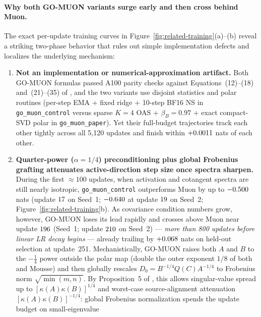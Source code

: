 \paragraph{Why both GO-MUON variants surge early and then cross behind Muon.}
The exact per-update training curves in Figure~\ref{fig:related-training}(a)--(b)
reveal a striking two-phase behavior that rules out simple implementation
defects and localizes the underlying mechanism:
\begin{enumerate}
\item \textbf{Not an implementation or numerical-approximation artifact.}
  Both GO-MUON formulas passed A100 parity checks against Equations~(12)--(18)
  and~(21)--(35) of \citet{che2026gomuon}, and the two variants use disjoint
  statistics and polar routines (per-step EMA + fixed ridge + 10-step BF16 NS
  in \texttt{go\_muon\_control} versus sparse $K=4$ OAS + $\beta_B=0.97$ +
  exact compact-SVD polar in \texttt{go\_muon\_paper}). Yet their full-budget
  trajectories track each other tightly across all 5{,}120 updates and finish
  within $+0.0011{}$ nats of each other.
\item \textbf{Quarter-power ($\alpha = 1/4$) preconditioning plus global
  Frobenius grafting attenuates active-direction step size once spectra
  sharpen.}
  During the first $\approx 100$ updates, when activation and cotangent spectra
  are still nearly isotropic, \texttt{go\_muon\_control} outperforms Muon by up
  to $-0.500{}$ nats (update $17{}$ on
  Seed~1; $-0.640{}$ at update $19{}$ on
  Seed~2; Figure~\ref{fig:related-training}b). As covariance condition numbers
  grow, however, GO-MUON loses its lead rapidly and crosses above Muon near
  update $196{}$ (Seed~1; update
  $210{}$ on Seed~2) --- \emph{more than 800 updates before
  linear LR decay begins} --- already trailing by
  $+0.068{}$ nats on held-out selection at update~251.
  Mechanistically, GO-MUON raises both $A$ and $B$ to the $-\frac{1}{4}$ power
  outside the polar map (double the outer exponent $1/8$ of both 
  and Mousse) and then globally rescales $D_0 = B^{-1/4}Q(C)A^{-1/4}$ to
  Frobenius norm $\sqrt{\min(m,n)}$. By Proposition~5 of \citet{che2026gomuon},
  this allows singular-value spread up to $[\kappa(A)\kappa(B)]^{1/4}$ and
  worst-case source-alignment attenuation $[\kappa(A)\kappa(B)]^{-1/4}$: global
  Frobenius normalization spends the update budget on small-eigenvalue

\end{enumerate}
